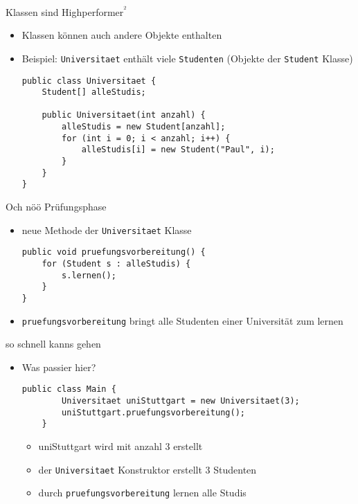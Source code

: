 \documentclass{../../presentation}
\begin{document}
\begin{frame}[fragile]{Klassen sind Highperformer\textsuperscript{²}}

\begin{itemize}
  \item<2-> Klassen können auch andere Objekte enthalten
  \item<3-> Beispiel: \texttt{Universitaet} enthält viele \texttt{Studenten} (Objekte der \texttt{Student} Klasse)
\begin{verbatim}
public class Universitaet {
    Student[] alleStudis;

    public Universitaet(int anzahl) {
        alleStudis = new Student[anzahl];
        for (int i = 0; i < anzahl; i++) {
            alleStudis[i] = new Student("Paul", i);
        }
    }
}
\end{verbatim}
\end{itemize}
\end{frame}


\begin{frame}[fragile]{Och nöö Prüfungsphase}

\begin{itemize}
  \item<2-> neue Methode der \texttt{Universitaet} Klasse
\begin{verbatim}
public void pruefungsvorbereitung() {
    for (Student s : alleStudis) {
        s.lernen();
    }
}
\end{verbatim}
  \item<3-> \texttt{pruefungsvorbereitung} bringt alle Studenten einer Universität zum lernen
\end{itemize}
\end{frame}

\begin{frame}[fragile]{so schnell kanns gehen}

\begin{itemize}
  \item<2-> Was passier hier?
\begin{verbatim}
public class Main {
        Universitaet uniStuttgart = new Universitaet(3);
        uniStuttgart.pruefungsvorbereitung();
    }
\end{verbatim}
  \begin{itemize}
		\item<4->[\textbullet]uniStuttgart wird mit anzahl 3 erstellt 
		\item<5->[\textbullet]der \texttt{Universitaet} Konstruktor erstellt 3 Studenten
		\item<6->[\textbullet]durch \texttt{pruefungsvorbereitung} lernen alle Studis
	\end{itemize}
\end{itemize}
\end{frame}
\end{document}
